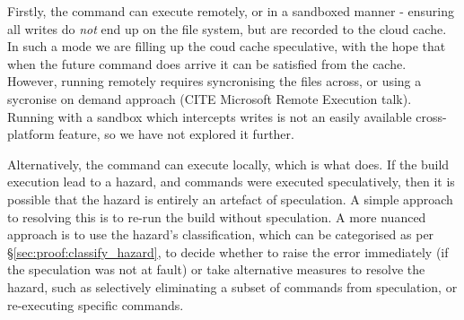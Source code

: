 Firstly, the command can execute remotely, or in a sandboxed manner - ensuring all writes do \emph{not} end up on the file system, but are recorded to the cloud cache. In such a mode we are filling up the coud cache speculative, with the hope that when the future command does arrive it can be satisfied from the cache. However, running remotely requires syncronising the files across, or using a sycronise on demand approach (CITE Microsoft Remote Execution talk). Running with a sandbox which intercepts writes is not an easily available cross-platform feature, so we have not explored it further.

Alternatively, the command can execute locally, which is what \Rattle does. If the build execution lead to a hazard, and commands were executed speculatively, then it is possible that the hazard is entirely an artefact of speculation.  A simple approach to resolving this is to re-run the build without speculation.  A more nuanced approach is to use the hazard's classification, which can be categorised as per \S\ref{sec:proof:classify_hazard}, to decide whether to raise the error immediately (if the speculation was not at fault) or take alternative measures to resolve the hazard, such as selectively eliminating a subset of commands from speculation, or re-executing specific commands.







